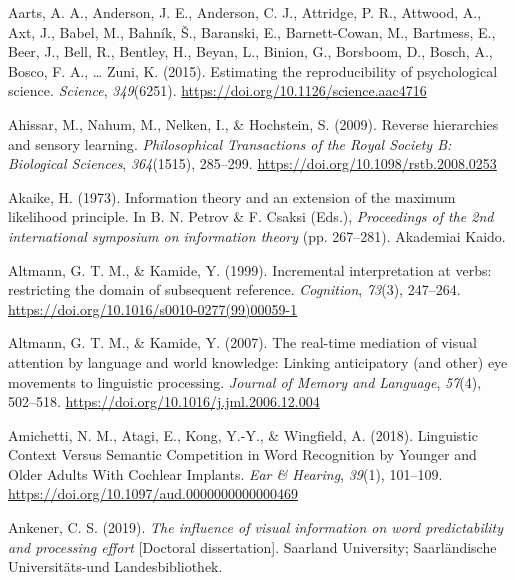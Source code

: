 \documentclass[a4paper, nobind]{templates/ociamthesis}
\newlength{\cslhangindent}
\newenvironment{CSLReferences}[2] %
 {%
  \setlength{\parindent}{0pt}
  \ifodd #1
  \let\oldpar\par
  \def\par{\hangindent=\cslhangindent\oldpar}
  \fi
  \setlength{\parskip}{1mm}
  \setlength{\baselineskip}{6mm}
 }%
 {}
\begin{document}
\hypertarget{refs}{}
\begin{CSLReferences}{1}{0}
\leavevmode{}%
Aarts, A. A., Anderson, J. E., Anderson, C. J., Attridge, P. R., Attwood, A., Axt, J., Babel, M., Bahník, Š., Baranski, E., Barnett-Cowan, M., Bartmess, E., Beer, J., Bell, R., Bentley, H., Beyan, L., Binion, G., Borsboom, D., Bosch, A., Bosco, F. A., \ldots{} Zuni, K. (2015). {Estimating the reproducibility of psychological science}. \emph{Science}, \emph{349}(6251). \url{https://doi.org/10.1126/science.aac4716}

\leavevmode{}%
Ahissar, M., Nahum, M., Nelken, I., \& Hochstein, S. (2009). {Reverse hierarchies and sensory learning}. \emph{Philosophical Transactions of the Royal Society B: Biological Sciences}, \emph{364}(1515), 285--299. \url{https://doi.org/10.1098/rstb.2008.0253}

\leavevmode{}%
Akaike, H. (1973). Information theory and an extension of the maximum likelihood principle. In B. N. Petrov \& F. Csaksi (Eds.), \emph{Proceedings of the 2nd international symposium on information theory} (pp. 267--281). Akademiai Kaido.

\leavevmode{}%
Altmann, G. T. M., \& Kamide, Y. (1999). Incremental interpretation at verbs: restricting the domain of subsequent reference. \emph{Cognition}, \emph{73}(3), 247--264. \url{https://doi.org/10.1016/s0010-0277(99)00059-1}

\leavevmode{}%
Altmann, G. T. M., \& Kamide, Y. (2007). {The real-time mediation of visual attention by language and world knowledge: Linking anticipatory (and other) eye movements to linguistic processing}. \emph{Journal of Memory and Language}, \emph{57}(4), 502--518. \url{https://doi.org/10.1016/j.jml.2006.12.004}

\leavevmode{}%
Amichetti, N. M., Atagi, E., Kong, Y.-Y., \& Wingfield, A. (2018). Linguistic Context Versus Semantic Competition in Word Recognition by Younger and Older Adults With Cochlear Implants. \emph{Ear \& Hearing}, \emph{39}(1), 101--109. \url{https://doi.org/10.1097/aud.0000000000000469}

\leavevmode{}%
Ankener, C. S. (2019). \emph{{The influence of visual information on word predictability and processing effort}} {[}Doctoral dissertation{]}. Saarland University; Saarl{ä}ndische Universit{ä}ts-und Landesbibliothek.


\end{CSLReferences}
\end{document}
